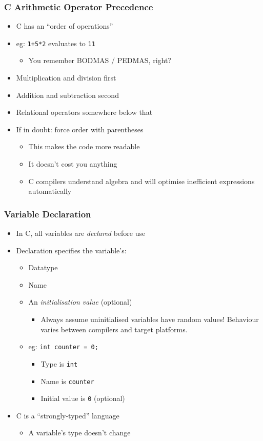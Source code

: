 \documentclass[14pt]{beamer}
\begin{document}
\begin{frame}
\frametitle{C Arithmetic Operator Precedence}
\begin{itemize}
\item C has an ``order of operations''
\item eg: \texttt{1+5*2} evaluates to \texttt{11}
	\begin{itemize}
		\item You remember BODMAS / PEDMAS, right?
	\end{itemize}
\item Multiplication and division first
\item Addition and subtraction second
\item Relational operators somewhere below that
\item If in doubt: force order with parentheses
	\begin{itemize}
		\item This makes the code more readable
		\item It doesn't cost you anything
		\item C compilers understand algebra and will optimise inefficient expressions automatically
	\end{itemize}

\end{itemize}
\end{frame}

\begin{frame}
\frametitle{Variable Declaration}
\begin{itemize}
\item In C, all variables are \textit{declared} before use
\item Declaration specifies the variable's:
	\begin{itemize}
		\item Datatype
		\item Name
		\item An \textit{initialisation value} (optional)
			\begin{itemize}
				\item Always assume uninitialised variables have random values! Behaviour varies between compilers and target platforms.
			\end{itemize}
		\item eg: \texttt{int counter = 0;}
			\begin{itemize}
				\item Type is \texttt{int}
				\item Name is \texttt{counter}
				\item Initial value is \texttt{0} (optional)
			\end{itemize}
	\end{itemize}
\item C is a ``strongly-typed'' language
	\begin{itemize}
		\item A variable's type doesn't change
	\end{itemize}
\end{itemize}
\end{frame}
\end{document}
